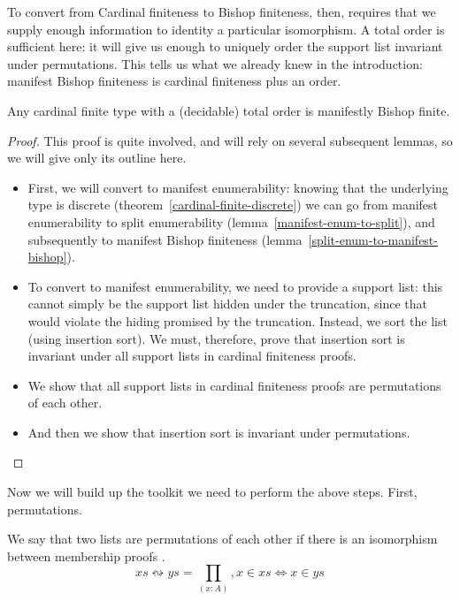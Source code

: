 To convert from Cardinal finiteness to Bishop finiteness, then, requires that we
supply enough information to identity a particular isomorphism.
A total order is sufficient here: it will give us enough to uniquely order the
support list invariant under permutations.
This tells us what we already knew in the introduction: manifest Bishop
finiteness is cardinal finiteness plus an order.

\begin{rm-theorem}
  Any cardinal finite type with a (decidable) total order is manifestly Bishop
  finite.
\end{rm-theorem}
\begin{proof}
  This proof is quite involved, and will rely on several subsequent lemmas, so
  we will give only its outline here.
  \begin{itemize}
    \item First, we will convert to manifest enumerability: knowing that the
      underlying type is discrete (theorem~\ref{cardinal-finite-discrete}) we can
      go from manifest enumerability to split enumerability
      (lemma~\ref{manifest-enum-to-split}), and subsequently to manifest Bishop
      finiteness (lemma~\ref{split-enum-to-manifest-bishop}).
    \item To convert to manifest enumerability, we need to provide a support
      list: this cannot simply be the support list hidden under the truncation,
      since that would violate the hiding promised by the truncation.
      Instead, we sort the list (using insertion sort).
      We must, therefore, prove that insertion sort is invariant under all
      support lists in cardinal finiteness proofs.
    \item We show that all support lists in cardinal finiteness proofs are
      permutations of each other.
    \item And then we show that insertion sort is invariant under permutations.
  \end{itemize} 
\end{proof}
Now we will build up the toolkit we need to perform the above steps.
First, permutations.
\begin{rm-definition}
  We say that two lists are permutations of each other if there is an
  isomorphism between membership proofs
  \cite{danielssonBagEquivalenceProofRelevant2012}.
  \begin{equation}
    \mathit{xs} \leftrightsquigarrow \mathit{ys} = \prod_{(x : A)} , x \in \mathit{xs} \iff x \in \mathit{ys}
  \end{equation}
\end{rm-definition}
